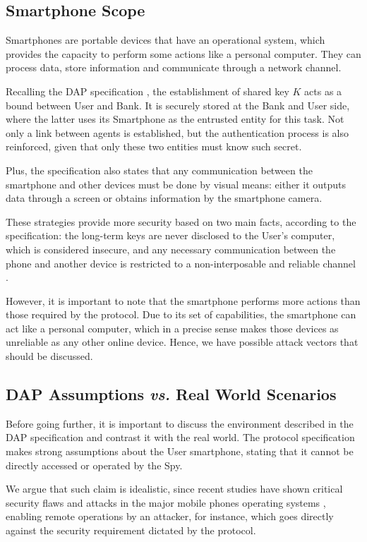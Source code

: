 \subsection{Smartphone Scope}
\label{sec:smartphone-first-analysis}
Smartphones are portable devices that have an operational system, which provides the capacity to perform some actions like a personal computer. They can process data, store information and communicate through a network channel.

Recalling the DAP specification \cite[Ch. 4]{Peotta2012}, the establishment of shared key $K$ acts as a bound between User and Bank. It is securely stored at the Bank and User side, where the latter uses its Smartphone as the entrusted entity for this task. Not only a link between agents is established, but the authentication process is also reinforced, given that only these two entities must know such secret.

Plus, the specification also states that any communication between the smartphone and other devices must be done by visual means: either it outputs data through a screen or obtains information by the smartphone camera.

These strategies provide more security based on two main facts, according to the specification: the long-term keys are never disclosed to the User's computer, which is considered insecure, and any necessary communication between the phone and another device is restricted to a non-interposable and reliable channel \cite{Peotta2012}.

However, it is important to note that the smartphone performs more actions than those required by the protocol. Due to its set of capabilities, the smartphone can act like a personal computer, which in a precise sense makes those devices as unreliable as any other online device. Hence, we have possible attack vectors that should be discussed.



\subsection{DAP Assumptions \textit{vs.} Real World Scenarios}
\label{sec:dap-assumptions}
Before going further, it is important to discuss the environment described in the DAP specification and contrast it with the real world. The protocol specification makes strong assumptions about the User smartphone, stating that it cannot be directly accessed or operated by the Spy.

We argue that such claim is idealistic, since recent studies have shown critical security flaws and attacks in the major mobile phones operating systems \cite{ZhouJiang2012,Han2013}, enabling remote operations by an attacker, for instance, which goes directly against the security requirement dictated by the protocol. 

